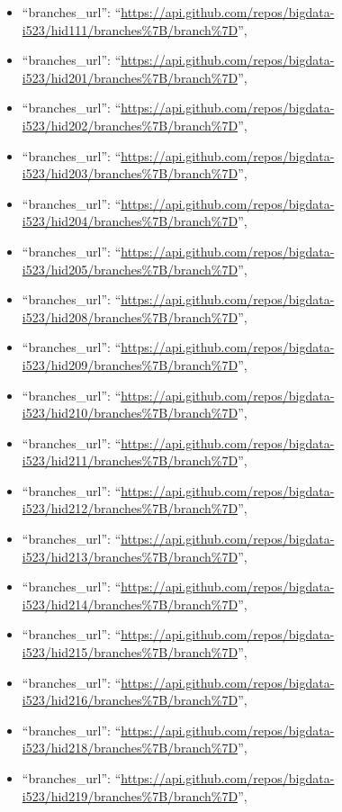 \begin{itemize}
\item
  ``branches\_url'':
  ``\url{https://api.github.com/repos/bigdata-i523/hid111/branches\%7B/branch\%7D}'',
\item
  ``branches\_url'':
  ``\url{https://api.github.com/repos/bigdata-i523/hid201/branches\%7B/branch\%7D}'',
\item
  ``branches\_url'':
  ``\url{https://api.github.com/repos/bigdata-i523/hid202/branches\%7B/branch\%7D}'',
\item
  ``branches\_url'':
  ``\url{https://api.github.com/repos/bigdata-i523/hid203/branches\%7B/branch\%7D}'',
\item
  ``branches\_url'':
  ``\url{https://api.github.com/repos/bigdata-i523/hid204/branches\%7B/branch\%7D}'',
\item
  ``branches\_url'':
  ``\url{https://api.github.com/repos/bigdata-i523/hid205/branches\%7B/branch\%7D}'',
\item
  ``branches\_url'':
  ``\url{https://api.github.com/repos/bigdata-i523/hid208/branches\%7B/branch\%7D}'',
\item
  ``branches\_url'':
  ``\url{https://api.github.com/repos/bigdata-i523/hid209/branches\%7B/branch\%7D}'',
\item
  ``branches\_url'':
  ``\url{https://api.github.com/repos/bigdata-i523/hid210/branches\%7B/branch\%7D}'',
\item
  ``branches\_url'':
  ``\url{https://api.github.com/repos/bigdata-i523/hid211/branches\%7B/branch\%7D}'',
\item
  ``branches\_url'':
  ``\url{https://api.github.com/repos/bigdata-i523/hid212/branches\%7B/branch\%7D}'',
\item
  ``branches\_url'':
  ``\url{https://api.github.com/repos/bigdata-i523/hid213/branches\%7B/branch\%7D}'',
\item
  ``branches\_url'':
  ``\url{https://api.github.com/repos/bigdata-i523/hid214/branches\%7B/branch\%7D}'',
\item
  ``branches\_url'':
  ``\url{https://api.github.com/repos/bigdata-i523/hid215/branches\%7B/branch\%7D}'',
\item
  ``branches\_url'':
  ``\url{https://api.github.com/repos/bigdata-i523/hid216/branches\%7B/branch\%7D}'',
\item
  ``branches\_url'':
  ``\url{https://api.github.com/repos/bigdata-i523/hid218/branches\%7B/branch\%7D}'',
\item
  ``branches\_url'':
  ``\url{https://api.github.com/repos/bigdata-i523/hid219/branches\%7B/branch\%7D}'',

\end{itemize}
